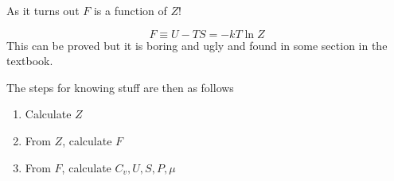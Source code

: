 \documentclass[10pt]{article}
\begin{document}
As it turns out $ F $ is a function of $ Z $!

\begin{definition}
	\begin{equation}
		F \equiv U -TS = -kT \ln Z
		\label{eq:294:helmholtz_free_energy}
	\end{equation}
	This can be proved but it is boring and ugly and found in some section in the textbook.
\end{definition}

The steps for knowing stuff are then as follows



\begin{enumerate}
	\item Calculate $ Z $
	\item From $ Z $, calculate $ F $
	\item From $ F $, calculate $ C_v, U, S, P, \mu $
\end{enumerate}
\end{document}

